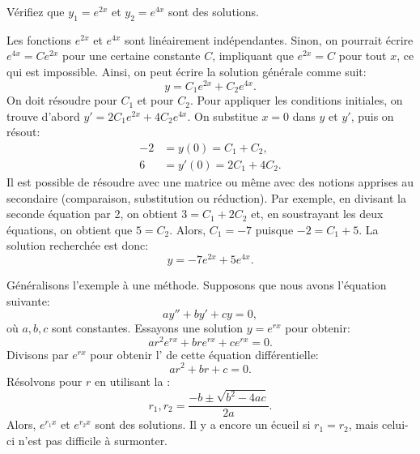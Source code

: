\begin{exercise}
	Vérifiez que $y_1= e^{2x}$ et $y_2= e^{4x}$ sont des solutions.
\end{exercise}

Les fonctions  $e^{2x}$ et $e^{4x}$ sont linéairement indépendantes. 
Sinon, on pourrait  écrire  $e^{4x} = C e^{2x}$ pour une certaine constante $C$,
impliquant que $e^{2x} = C$ pour tout $x$, ce qui est impossible. 
Ainsi, on peut écrire la solution générale comme suit:
\begin{equation*}
	y = C_1 e^{2x} + C_2 e^{4x} .
\end{equation*}
On doit résoudre pour $C_1$ et pour $C_2$.  Pour appliquer les conditions initiales,
on trouve d'abord $y' = 2 C_1 e^{2x} + 4 C_2 e^{4x}$.  On substitue $x=0$ dans
$y$ et $y'$, puis on résout: 
\begin{align*}
	-2 & = y(0) = C_1 + C_2 , \\
 	 6 & = y'(0) = 2 C_1 + 4 C_2 .
\end{align*}
Il est possible de résoudre avec une matrice ou même avec des notions apprises au secondaire (comparaison, substitution ou réduction). Par exemple, en divisant la seconde équation par 2, on obtient $3 = C_1 + 2 C_2$ et, en soustrayant les deux équations, on obtient que $5 = C_2$.  
Alors, $C_1 = -7$ puisque $-2 = C_1 + 5$.  La solution recherchée est donc:
\begin{equation*}
y = -7 e^{2x} + 5 e^{4x} .
\end{equation*}

\medskip

Généralisons l'exemple à une méthode. Supposons que nous avons l'équation suivante:
\begin{equation} \label{ccsol:eq}
	a y'' + b y' + c y = 0,
\end{equation}
où $a, b, c$ sont constantes.  
Essayons une solution  $y = e^{rx}$ pour obtenir:   
\begin{equation*}
	a r^2 e^{rx} +  b r e^{rx} +  c e^{rx} = 0 .
\end{equation*}
Divisons par  $e^{rx}$ pour obtenir  
l'\emph{} de cette équation différentielle:
\begin{equation*}
	a r^2 + b r +  c = 0 .
\end{equation*}
Résolvons pour $r$ en utilisant la  : 
\begin{equation*}
	r_1, r_2 = \frac{-b \pm \sqrt{b^2 - 4ac}}{2a} .
\end{equation*}
Alors, $e^{r_1 x}$ et $e^{r_2 x}$ sont des solutions.  
Il y a encore un écueil si $r_1 = r_2$, mais celui-ci n'est pas difficile à surmonter.  

